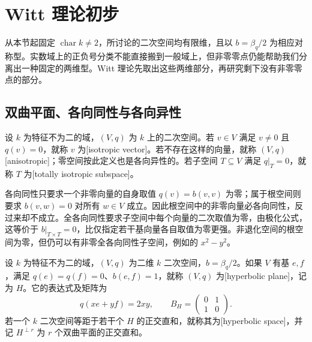 
\section{Witt 理论初步}
\label{b2:sec:1003}

从本节起固定 \(\operatorname{char}k\ne2\)，所讨论的二次空间均有限维，且以 \(b=\beta_q/2\) 为相应对称型。实数域上的正负号分类不能直接搬到一般域上，但非零零点仍能帮助我们分离出一种固定的两维型。Witt 理论先取出这些两维部分，再研究剩下没有非零零点的部分。

%
%

\subsection{双曲平面、各向同性与各向异性}
\label{b2:subsec:1003:01}

\begin{definition}\label{b2:def:isotropic-hyperbolic}
	设 \(k\) 为特征不为二的域，\((V,q)\) 为 \(k\) 上的二次空间。若 \(v\in V\) 满足 \(v\ne0\) 且 \(q(v)=0\)，就称 \(v\) 为[isotropic vector]。若不存在这样的向量，就称 \((V,q)\)[anisotropic]；零空间按此定义也是各向异性的。若子空间 \(T\subseteq V\) 满足 \(q|_T=0\)，就称 \(T\) 为[totally isotropic subspace]。
\end{definition}

各向同性只要求一个非零向量的自身取值 \(q(v)=b(v,v)\) 为零；属于根空间则要求 \(b(v,w)=0\) 对所有 \(w\in V\) 成立。因此根空间中的非零向量必各向同性，反过来却不成立。全各向同性要求子空间中每个向量的二次取值为零，由极化公式，这等价于 \(b|_{T\times T}=0\)，比仅指定若干基向量各自取值为零更强。非退化空间的根空间为零，但仍可以有非零全各向同性子空间，例如的 \(x^2-y^2\)。

\begin{definition}\label{b2:def:hyperbolic-plane}
	设 \(k\) 为特征不为二的域，\((V,q)\) 为二维 \(k\) 二次空间，\(b=\beta_q/2\)。如果 \(V\) 有基 \(e,f\)，满足 \(q(e)=q(f)=0\)、\(b(e,f)=1\)，就称 \((V,q)\) 为[hyperbolic plane]，记为 \(H\)。它的表达式及矩阵为
	\[
		q(xe+yf)=2xy,\qquad B_H=\begin{pmatrix}0&1\\1&0\end{pmatrix}.
	\]
	若一个 \(k\) 二次空间等距于若干个 \(H\) 的正交直和，就称其为[hyperbolic space]，并记 \(H^{\perp r}\) 为 \(r\) 个双曲平面的正交直和。
\end{definition}

